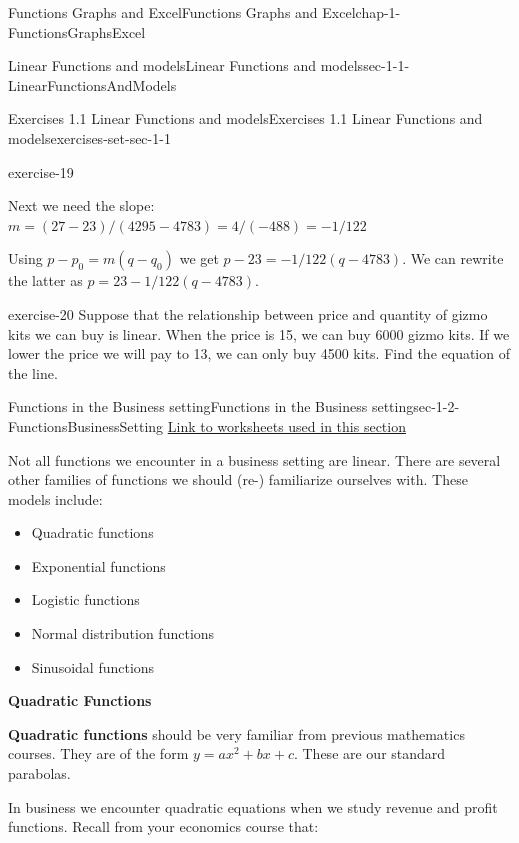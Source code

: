 \documentclass[oneside,10pt,]{book}
\newcommand{\terminology}[1]{\textbf{#1}}
\numberwithin{equation}{section}
\begin{document}
\begin{chapterptx}{Functions Graphs and Excel}{}{Functions Graphs and Excel}{}{}{chap-1-FunctionsGraphsExcel}
\begin{sectionptx}{Linear Functions and models}{}{Linear Functions and models}{}{}{sec-1-1-LinearFunctionsAndModels}
\begin{exercises-subsection-numberless}{Exercises 1.1 Linear Functions and models}{}{Exercises 1.1 Linear Functions and models}{}{}{exercises-set-sec-1-1}
\begin{divisionexercise}{19}{}{}{exercise-19}
\par
\hypertarget{p-132}{}%
Next we need the slope: \(m=  (27-23)/(4295-4783)=4/(-488)=-1/122\)%
\par
\hypertarget{p-133}{}%
Using \(p-p_0=m (q-q_0 )\)   we get \(p-23=-1/122  (q-4783)\). We can rewrite the latter as \(p=23-1/122  (q-4783)\).%
\end{divisionexercise}%
\begin{divisionexercise}{20}{}{}{exercise-20}%
\hypertarget{p-134}{}%
Suppose that the relationship between price and quantity of gizmo kits we can buy is linear.  When the price is \textdollar{}15, we can buy 6000 gizmo kits.  If we lower the price we will pay to \textdollar{}13, we can only buy 4500 kits.  Find the equation of the line.%
\end{divisionexercise}%
\end{exercises-subsection-numberless}
\end{sectionptx}
%
%
\typeout{************************************************}
\typeout{************************************************}
%
\begin{sectionptx}{Functions in the Business setting}{}{Functions in the Business setting}{}{}{sec-1-2-FunctionsBusinessSetting}
\hypertarget{p-135}{}%
\href{./Examples/Section-1-2-Examples.xlsx}{Link to worksheets used in this section}%
\par
\hypertarget{p-136}{}%
Not all functions we encounter in a business setting are linear. There are several other families of functions we should (re-) familiarize ourselves with. These models include:\leavevmode%
\begin{itemize}[label=\textbullet]
\item{}Quadratic functions%
\item{}Exponential functions%
\item{}Logistic functions%
\item{}Normal distribution functions%
\item{}Sinusoidal functions%
\end{itemize}
%
\par
\hypertarget{p-137}{}%
\terminology{Quadratic Functions}%
\par
\hypertarget{p-138}{}%
\terminology{Quadratic functions} should be very familiar from previous mathematics courses. They are of the form \(y=a x^2+b x+c\). These are our standard parabolas.%
\par
\hypertarget{p-139}{}%
In business we encounter quadratic equations when we study revenue and profit functions. Recall from your economics course that:%

\end{sectionptx}
\end{chapterptx}
\end{document}
